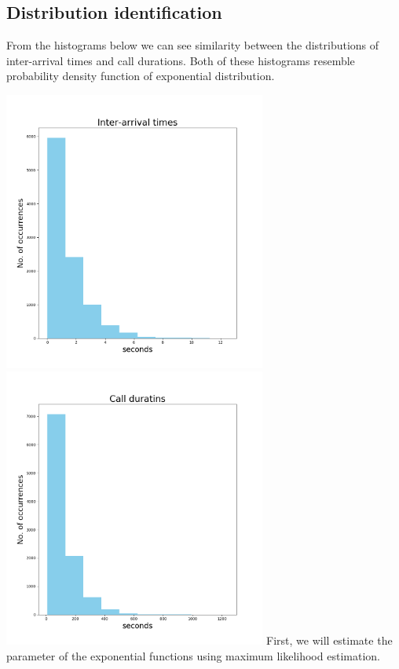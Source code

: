 \documentclass[12pt,a4paper]{article}
\begin{document}
\subsection{Distribution identification}
From the histograms below we can see similarity between the distributions of inter-arrival times and call durations. Both of these histograms resemble probability density function of exponential distribution.\par
\smallskip
\noindent \includegraphics[width=3.4in]{Figure_1}
\includegraphics[width=3.4in]{Figure_3}
First, we will estimate the parameter of the exponential functions using maximum likelihood estimation.
\end{document}
